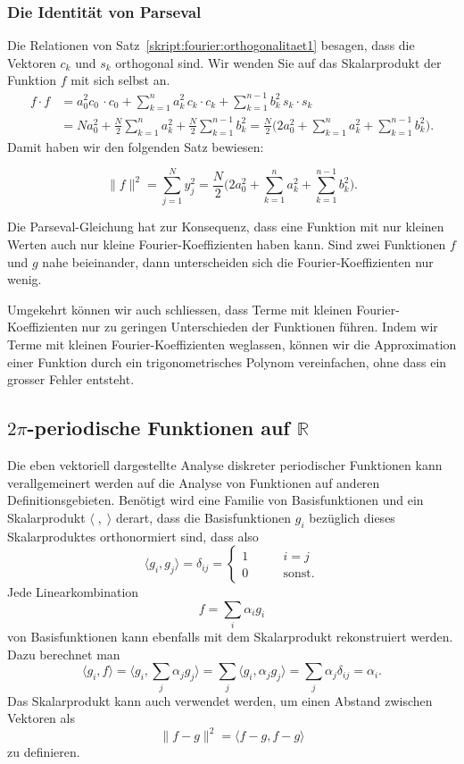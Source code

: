\subsubsection{Die Identität von Parseval}
Die Relationen von
Satz~\ref{skript:fourier:orthogonalitaet1}
besagen, dass die Vektoren $c_k$ und $s_k$ orthogonal sind.
Wir wenden Sie auf das Skalarprodukt der Funktion $f$ mit sich selbst an.
\begin{align*}
f\cdot f
&=
a_0^2 c_0\,\cdot c_0
+
\sum_{k=1}^na_k^2 \,c_k\cdot c_k
+
\sum_{k=1}^{n-1} b_k^2\,s_k\cdot s_k
\\
&=
Na_0^2
+
\frac{N}2\sum_{k=1}^n a_k^2
+
\frac{N}2\sum_{k=1}^{n-1} b_k^2
=
\frac{N}2
\biggl(
2a_0^2
+
\sum_{k=1}^n a_k^2
+
\sum_{k=1}^{n-1} b_k^2
\biggr).
\end{align*}
Damit haben wir den folgenden Satz bewiesen:
\begin{satz}[Parseval]
\[
\|f\|^2
=
\sum_{j=1}^N y_j^2
=
\frac{N}2
\biggl(
2a_0^2
+
\sum_{k=1}^n a_k^2
+
\sum_{k=1}^{n-1} b_k^2
\biggr).
\]
\end{satz}
%
Die Parseval-Gleichung hat zur Konsequenz, dass eine Funktion mit nur
kleinen Werten auch nur kleine Fourier-Koeffizienten haben kann.
Sind zwei Funktionen $f$ und $g$ nahe beieinander, dann unterscheiden
sich die Fourier-Koeffizienten nur wenig.

Umgekehrt können wir auch schliessen, dass Terme mit kleinen
Fourier-Koeffizienten nur zu geringen Unterschieden der Funktionen
führen.
Indem wir Terme mit kleinen Fourier-Koeffizienten weglassen, 
können wir die Approximation einer Funktion durch ein trigonometrisches
Polynom vereinfachen, ohne dass ein grosser Fehler entsteht.

\subsection{$2\pi$-periodische Funktionen auf $\mathbb R$\label{subsection:fourier:stetig}}
Die eben vektoriell dargestellte Analyse diskreter periodischer Funktionen 
kann verallgemeinert werden auf die Analyse von Funktionen auf
anderen Definitionsgebieten.
Benötigt wird eine Familie von Basisfunktionen und ein Skalarprodukt
$\langle\;,\;\rangle$ derart, dass die Basisfunktionen $g_i$ bezüglich
dieses Skalarproduktes orthonormiert sind, dass also
\[
\langle g_i,g_j\rangle
=
\delta_{ij}
=
\begin{cases}
1&\qquad i=j\\
0&\qquad\text{sonst}.
\end{cases}
\]
Jede Linearkombination
\[
f = \sum_{i} \alpha_i g_i
\]
von Basisfunktionen kann ebenfalls mit dem Skalarprodukt rekonstruiert
werden.
Dazu berechnet man
\[
\langle g_i,f\rangle
=
\biggl\langle
g_i,\sum_j\alpha_jg_j
\biggr\rangle
=
\sum_j \langle g_i,\alpha_jg_j\rangle
=
\sum_j \alpha_j\delta_{ij}
=
\alpha_i.
\]
Das Skalarprodukt kann auch verwendet werden, um einen Abstand zwischen
Vektoren als
\[
\| f-g\|^2
=
\langle f-g,f-g\rangle
\]
zu definieren.


